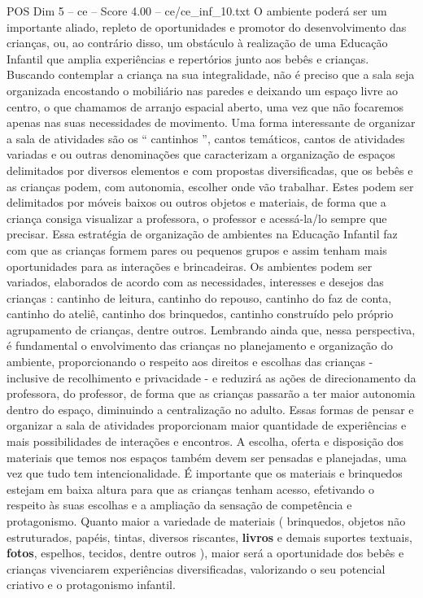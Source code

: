 \begin{textsample}{POS Dim 5 – ce – Score 4.00 – ce/ce\_inf\_10.txt}
O ambiente poderá ser um importante aliado, repleto de oportunidades e promotor do desenvolvimento das crianças, ou, ao contrário disso, um obstáculo à realização de uma Educação Infantil que amplia experiências e repertórios junto aos bebês e crianças.
Buscando contemplar a criança na sua integralidade, não é preciso que a sala seja organizada encostando o mobiliário nas paredes e deixando um espaço livre ao centro, o que chamamos de arranjo espacial aberto, uma vez que não focaremos apenas nas suas necessidades de movimento.
Uma forma interessante de organizar a sala de atividades são os “ cantinhos ”, cantos temáticos, cantos de atividades variadas e ou outras denominações que caracterizam a organização de espaços delimitados por diversos elementos e com propostas diversificadas, que os bebês e as crianças podem, com autonomia, escolher onde vão trabalhar.
Estes podem ser delimitados por móveis baixos ou outros objetos e materiais, de forma que a criança consiga visualizar a professora, o professor e acessá-la/lo sempre que precisar.
Essa estratégia de organização de ambientes na Educação Infantil faz com que as crianças formem pares ou pequenos grupos e assim tenham mais oportunidades para as interações e brincadeiras.
Os ambientes podem ser variados, elaborados de acordo com as necessidades, interesses e desejos das crianças : cantinho de leitura, cantinho do repouso, cantinho do faz de conta, cantinho do ateliê, cantinho dos brinquedos, cantinho construído pelo próprio agrupamento de crianças, dentre outros.
Lembrando ainda que, nessa perspectiva, é fundamental o envolvimento das crianças no planejamento e organização do ambiente, proporcionando o respeito aos direitos e escolhas das crianças - inclusive de recolhimento e privacidade - e reduzirá as ações de direcionamento da professora, do professor, de forma que as crianças passarão a ter maior autonomia dentro do espaço, diminuindo a centralização no adulto.
Essas formas de pensar e organizar a sala de atividades proporcionam maior quantidade de experiências e mais possibilidades de interações e encontros.
A escolha, oferta e disposição dos materiais que temos nos espaços também devem ser pensadas e planejadas, uma vez que tudo tem intencionalidade.
É importante que os materiais e brinquedos estejam em baixa altura para que as crianças tenham acesso, efetivando o respeito às suas escolhas e a ampliação da sensação de competência e protagonismo.
Quanto maior a variedade de materiais ( brinquedos, objetos não estruturados, papéis, tintas, diversos riscantes, \textbf{livros} e demais suportes textuais, \textbf{fotos}, espelhos, tecidos, dentre outros ), maior será a oportunidade dos bebês e crianças vivenciarem experiências diversificadas, valorizando o seu potencial criativo e o protagonismo infantil.

\end{textsample}
